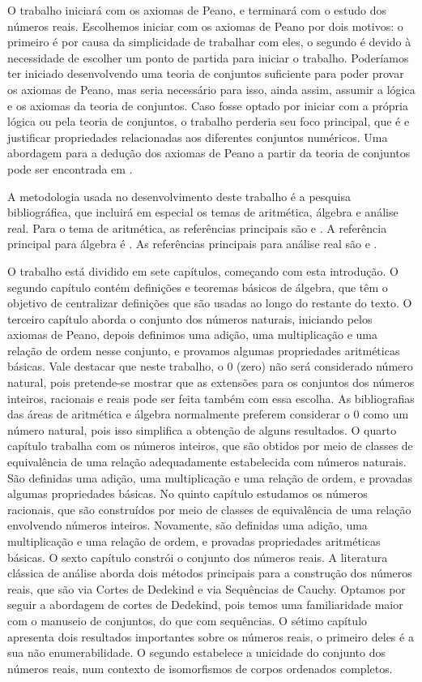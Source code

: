 \documentclass[../main.tex]{subfiles}
\begin{document}
O trabalho iniciará com os axiomas de Peano, e terminará com o estudo dos números reais. Escolhemos iniciar com os axiomas de Peano por dois motivos: o primeiro é por causa da simplicidade de trabalhar com eles, o segundo é devido à necessidade de escolher um ponto de partida para iniciar o trabalho. Poderíamos ter iniciado desenvolvendo uma teoria de conjuntos suficiente para poder provar os axiomas de Peano, mas seria necessário para isso, ainda assim, assumir a lógica e os axiomas da teoria de conjuntos. Caso fosse optado por iniciar com a própria lógica ou pela teoria de conjuntos, o trabalho perderia seu foco principal, que é e justificar propriedades relacionadas aos diferentes conjuntos numéricos. Uma abordagem para a dedução dos axiomas de Peano a partir da teoria de conjuntos pode ser encontrada em \textcite{suppes}.

A metodologia usada no desenvolvimento deste trabalho é a pesquisa bibliográfica, que incluirá em especial os temas de aritmética, álgebra e análise real. Para o tema de aritmética, as referências principais são \textcite{ferreira} e \textcite{domingues-2009}. A referência principal para álgebra é \textcite{domingues-iezzi-2018}. As referências principais para análise real são \textcite{guidorizzi} e \textcite{lima-analise-1}.

O trabalho está dividido em sete capítulos, começando com esta introdução. O segundo capítulo contém definições e teoremas básicos de álgebra, que têm o objetivo de centralizar definições que são usadas ao longo do restante do texto. O terceiro capítulo aborda o conjunto dos números naturais, iniciando pelos axiomas de Peano, depois definimos uma adição, uma multiplicação e uma relação de ordem nesse conjunto, e provamos algumas propriedades aritméticas básicas. Vale destacar que neste trabalho, o $0$ (zero) não será considerado número natural, pois pretende-se mostrar que as extensões para os conjuntos dos números inteiros, racionais e reais pode ser feita também com essa escolha. As bibliografias das áreas de aritmética e álgebra normalmente preferem considerar o $0$ como um número natural, pois isso simplifica a obtenção de alguns resultados. O quarto capítulo trabalha com os números inteiros, que são obtidos por meio de classes de equivalência de uma relação adequadamente estabelecida com números naturais. São definidas uma adição, uma multiplicação e uma relação de ordem, e provadas algumas propriedades básicas. No quinto capítulo estudamos os números racionais, que são construídos por meio de classes de equivalência de uma relação envolvendo números inteiros. Novamente, são definidas uma adição, uma multiplicação e uma relação de ordem, e provadas propriedades aritméticas básicas. O sexto capítulo constrói o conjunto dos números reais. A literatura clássica de análise aborda dois métodos principais para a construção dos números reais, que são via Cortes de Dedekind e via Sequências de Cauchy. Optamos por seguir a abordagem de cortes de Dedekind, pois temos uma familiaridade maior com o manuseio de conjuntos, do que com sequências. O sétimo capítulo apresenta dois resultados importantes sobre os números reais, o primeiro deles é a sua não enumerabilidade. O segundo estabelece a unicidade do conjunto dos números reais, num contexto de isomorfismos de corpos ordenados completos. 
\end{document}
